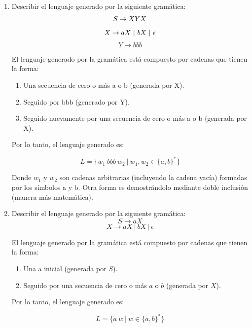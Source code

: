 \documentclass[12pt]{book} %
\begin{document}
\begin{enumerate}
\def\labelenumi{\alph{enumi})}
\item
  Describir el lenguaje generado por la siguiente gramática: \[
   S \to XYX \\
   \] \[
   X \to aX \ | \ bX \ | \ \epsilon \\
   \] \[
   Y \to bbb
   \]

  \begin{solucion}[Ejercicio 1.a]

   El lenguaje generado por la gramática está compuesto por cadenas que tienen la forma:

   \begin{enumerate}
       \item Una secuencia de cero o más a o b (generada por X).
       \item Seguido por bbb (generado por Y).
       \item Seguido nuevamente por una secuencia de cero o más a o b (generada por X).
   \end{enumerate}

   Por lo tanto, el lenguaje generado es:

   $$
   L = \{ w_1 \ bbb \ w_2 \ | \ w_1, w_2 \in \{a, b\}^* \}
   $$

   Donde $w_1$ y $w_2$ son cadenas arbitrarias (incluyendo la cadena vacía) formadas por los símbolos a y b. Otra forma es demostrándolo mediante doble inclusión (manera más matemática).

   \end{solucion}
\item
  Describir el lenguaje generado por la siguiente gramática: \[
   S \to aX 
   \] \[
   X \to aX \ | \ bX \ | \ \epsilon
   \]

  \begin{solucion}[Ejercicio 1.b]

   El lenguaje generado por la gramática está compuesto por cadenas que tienen la forma:

   \begin{enumerate}
       \item Una a inicial (generada por $S$).
       \item Seguido por una secuencia de cero o más $a$ o $b$ (generada por $X$).
   \end{enumerate}

   Por lo tanto, el lenguaje generado es:

   $$
   L = \{ a \ w \ | \ w \in \{a, b\}^* \}
   $$


\end{solucion}
\end{enumerate}
\end{document}

